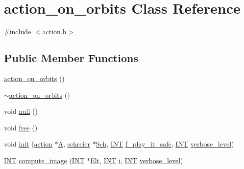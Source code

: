 \hypertarget{classaction__on__orbits}{}\section{action\+\_\+on\+\_\+orbits Class Reference}
\label{classaction__on__orbits}


{\ttfamily \#include $<$action.\+h$>$}

\subsection*{Public Member Functions}
\begin{DoxyCompactItemize}
\item 
\mbox{\hyperlink{classaction__on__orbits_aee8456259fe7933e8f42c337145d7243}{action\+\_\+on\+\_\+orbits}} ()
\item 
\mbox{\hyperlink{classaction__on__orbits_abbb682d9b41be063bdbbbf815a4ec402}{$\sim$action\+\_\+on\+\_\+orbits}} ()
\item 
void \mbox{\hyperlink{classaction__on__orbits_a033e5a9fa0598c832a1e774497cbd00d}{null}} ()
\item 
void \mbox{\hyperlink{classaction__on__orbits_a2c481e0fc48bbd6e3c0d7dd4c16f44e2}{free}} ()
\item 
void \mbox{\hyperlink{classaction__on__orbits_afec4b044b202a0226de13bc1f5c90a4f}{init}} (\mbox{\hyperlink{classaction}{action}} $\ast$\mbox{\hyperlink{classaction__on__orbits_a0093589ff431dbef11cfdde928b4b5f3}{A}}, \mbox{\hyperlink{classschreier}{schreier}} $\ast$\mbox{\hyperlink{classaction__on__orbits_a229383dae1c4102b8ac54df3263677d2}{Sch}}, \mbox{\hyperlink{galois_8h_a09fddde158a3a20bd2dcadb609de11dc}{I\+NT}} \mbox{\hyperlink{classaction__on__orbits_a7c1268383dd0a1ee5af6c8890721d8d8}{f\+\_\+play\+\_\+it\+\_\+safe}}, \mbox{\hyperlink{galois_8h_a09fddde158a3a20bd2dcadb609de11dc}{I\+NT}} \mbox{\hyperlink{simeon_8_c_a818073fbcc2f439e7c56952f67386122}{verbose\+\_\+level}})
\item 
\mbox{\hyperlink{galois_8h_a09fddde158a3a20bd2dcadb609de11dc}{I\+NT}} \mbox{\hyperlink{classaction__on__orbits_ae32159cdaf30612c7e47de4593b32342}{compute\+\_\+image}} (\mbox{\hyperlink{galois_8h_a09fddde158a3a20bd2dcadb609de11dc}{I\+NT}} $\ast$\mbox{\hyperlink{simeon_8_c_aec1406935bdb1fee3561fcb840964100}{Elt}}, \mbox{\hyperlink{galois_8h_a09fddde158a3a20bd2dcadb609de11dc}{I\+NT}} \mbox{\hyperlink{alphabet2_8_c_acb559820d9ca11295b4500f179ef6392}{i}}, \mbox{\hyperlink{galois_8h_a09fddde158a3a20bd2dcadb609de11dc}{I\+NT}} \mbox{\hyperlink{simeon_8_c_a818073fbcc2f439e7c56952f67386122}{verbose\+\_\+level}})
\end{DoxyCompactItemize}

